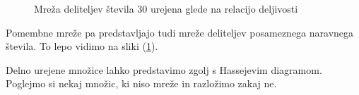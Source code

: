 \documentclass[a4paper]{article}
\begin{document}
\begin{figure}
\centering
{}
\caption{Mreža deliteljev števila $30$ urejena glede na relacijo deljivosti}
\label{im:divisors_of_30_hasse_diagram}
\end{figure}

Pomembne mreže pa predstavljajo tudi mreže deliteljev posameznega naravnega števila. To lepo vidimo na sliki (\ref{im:divisors_of_30_hasse_diagram}).

Delno urejene množice lahko predstavimo zgolj s Hassejevim diagramom. Poglejmo si nekaj množic, ki niso mreže in razložimo zakaj ne.
\end{document}
